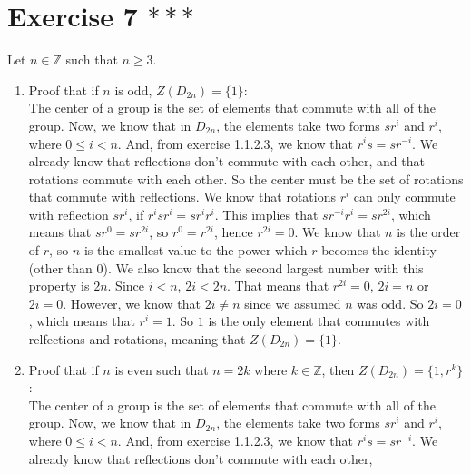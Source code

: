 \documentclass{article}
\newcommand{\Z}{\mathbb{Z}}
\begin{document}
    \section*{Exercise 7 $***$}
    Let $n \in \Z$ such that $n \geqslant 3$. \\
    \begin{enumerate}[label=\textbf{\alph*.}]
        \item    
            Proof that if $n$ is odd, $Z(D_{2n}) = \{1\}$: \\
            The center of a group is the set of elements that commute
            with all of the group.
            Now, we know that in $D_{2n}$,
            the elements take two forms $sr^i$ and $r^i$,
            where $0 \leqslant i < n$.
            And, from exercise 1.1.2.3, we know that $r^is = sr^{-i}$.
            We already know that reflections don't commute with each other,
            and that rotations commute with each other.
            So the center must be the set of rotations that commute with
            reflections.
            We know that rotations $r^i$ can only commute with
            reflection $sr^i$,
            if $r^isr^i = sr^ir^i$.
            This implies that $sr^{-i}r^i = sr^{2i}$,
            which means that $sr^{0} = sr^{2i}$,
            so $r^{0} = r^{2i}$,
            hence $r^{2i} = 0$.
            We know that $n$ is the order of $r$,
            so $n$ is the smallest value to the power which $r$
            becomes the identity (other than 0).
            We also know that the second largest number with this
            property is $2n$.
            Since $i < n$, $2i < 2n$.
            That means that $r^{2i} = 0$, $2i = n$ or $2i = 0$.
            However, we know that $2i \neq n$ since we assumed $n$ was odd.
            So $2i = 0$, which means that $r^i = 1$.
            So $1$ is the only element that commutes with relfections
            and rotations,
            meaning that $Z(D_{2n}) = \{1\}$.
        \item
            Proof that if $n$ is even such that $n = 2k$ where $k \in \Z$,
            then $Z(D_{2n}) = \{1, r^k\}$: \\
            The center of a group is the set of elements that commute
            with all of the group.
            Now, we know that in $D_{2n}$,
            the elements take two forms $sr^i$ and $r^i$,
            where $0 \leqslant i < n$.
            And, from exercise 1.1.2.3, we know that $r^is = sr^{-i}$.
            We already know that reflections don't commute with each other,

\end{enumerate}
\end{document}
